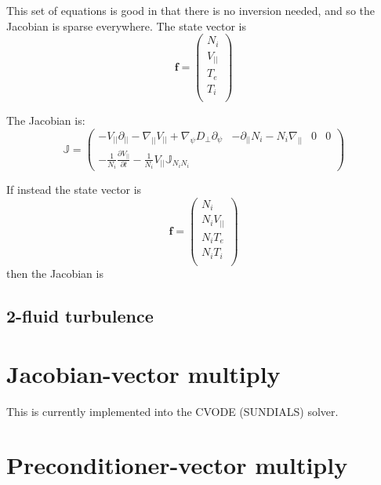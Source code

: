 \documentclass[12pt]{article}
\newcommand{\deriv}[2]{\ensuremath{\frac{\partial #1}{\partial #2}}}
\newcommand{\Vpar}{\ensuremath{V_{||}}}
\newcommand{\Vec}[1]{\ensuremath{\mathbf{#1}}}
\newcommand{\Jac}{\ensuremath{\mathbb{J}}}
\begin{document}
This set of equations is good in that there is no inversion needed,
and so the Jacobian is sparse everywhere. The state vector is
\[
\Vec{f} = \left(\begin{array}{c}
N_i \\
\Vpar \\
T_e \\
T_i \\
\end{array}\right)
\]

The Jacobian is:
\begin{equation}
\mathbb{J} = 
\left( \begin{array}{c|c|c|c}
  -\Vpar\partial_{||} - \nabla_{||}\Vpar + \nabla_\psi D_\perp\partial_\psi & -\partial_{||}N_i - N_i\nabla_{||} & 0 & 0 \\
-\frac{1}{N_i}\deriv{\Vpar}{t} - \frac{1}{N_i}\Vpar\Jac_{N_iN_i} & & &
\end{array}\right)
\end{equation}


If instead the state vector is
\[
\Vec{f} = \left(\begin{array}{c}
N_i \\
N_i\Vpar \\
N_iT_e \\
N_iT_i \\
\end{array}\right)
\]
then the Jacobian is



\subsection{2-fluid turbulence}


\section{Jacobian-vector multiply}

This is currently implemented into the CVODE (SUNDIALS) solver.

\section{Preconditioner-vector multiply}
\end{document}
